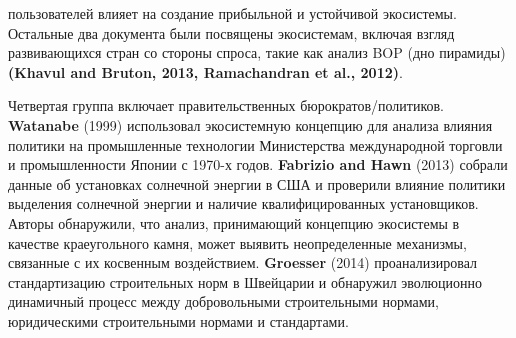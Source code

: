 \begin{SCn}
{{\begin{scnitemize}
			пользователей влияет на создание прибыльной и устойчивой экосистемы. Остальные два документа
			были посвящены экосистемам, включая взгляд развивающихся стран со стороны спроса, такие как анализ BOP (дно пирамиды)
			\textbf{(Khavul and Bruton, 2013, Ramachandran et al., 2012)}.
			\item Четвертая группа включает правительственных бюрократов/политиков. \textbf{Watanabe} (1999) использовал экосистемную
			концепцию для анализа влияния политики на промышленные технологии Министерства международной торговли и промышленности
			Японии с 1970-х годов. \textbf{Fabrizio and Hawn} (2013) собрали данные об установках солнечной энергии в США
			и проверили влияние политики выделения солнечной энергии и наличие квалифицированных установщиков.
			Авторы обнаружили, что анализ, принимающий концепцию экосистемы в качестве краеугольного камня, может выявить неопределенные 
			механизмы, связанные с их косвенным воздействием. \textbf{Groesser} (2014) проанализировал стандартизацию строительных норм в Швейцарии и обнаружил
			эволюционно динамичный процесс между добровольными строительными нормами, юридическими
			строительными нормами и стандартами.
		\end{scnitemize}
	}
    }


\bigskip
\scnendstruct \scnendcurrentsectioncomment

\end{SCn}
